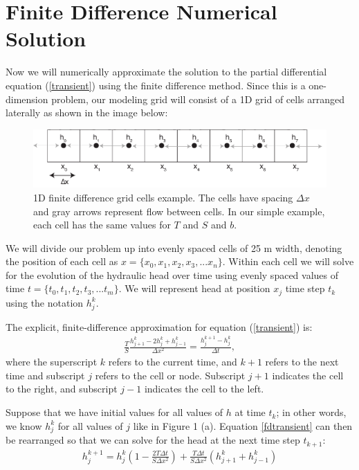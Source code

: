 \documentclass[11pt, oneside]{article}   	%
\begin{document}
\section*{Finite Difference Numerical Solution}
Now we will numerically approximate the solution to the partial differential equation (\ref{transient}) using the finite difference method.  Since this is a one-dimension problem, our modeling grid will consist of a 1D grid of cells arranged laterally as shown in the image below:

\begin{figure}[htbp]
\begin{center}
\includegraphics[width=.75\textwidth]{grid.pdf}
\caption{1D finite difference grid cells example.  The cells have spacing $\Delta x$ and gray arrows represent flow between cells. In our simple example, each cell has the same values for $T$ and $S$ and $b$.  }
\label{grid}
\end{center}
\end{figure}


We will divide our problem up into evenly spaced cells of 25 m width, denoting the position of each cell as $x = \{x_0, x_1, x_2, x_3, ... x_n\}$.   Within each cell we will solve for the evolution of the hydraulic head over time using evenly spaced values of time $t = \{t_0, t_1, t_2, t_3, ... t_m\}$.  We will represent head at position $x_j$ time step $t_k$ using the notation $h_j^k$. 


The explicit, finite-difference approximation for equation (\ref{transient}) is:
\begin{eqnarray}
\frac{T}{S}\frac{h^k_{j+1}-2 h^k_{j} + h^k_{j-1} }{\Delta x^2} = \frac{h_j^{k+1}-h_j^k }{\Delta t},
\label{fdtransient}
\end{eqnarray}
where the superscript $k$ refers to the current time, and $k+1$ refers to the next time and subscript $j$ refers to the cell or node. Subscript $j+1$ indicates the cell to the right, and subscript $j-1$ indicates the cell to the left.  

Suppose that we have initial values for all values of $h$ at time $t_k$; in other words, we know $h_j^k$ for all values of $j$ like in Figure 1 (a). Equation \ref{fdtransient} can then be rearranged so that we can solve for the head at the next time step $t_{k+1}$:
\begin{eqnarray}
h_j^{k+1} = h_j^{k} \left ( 1 - \frac{2T\Delta t}{S\Delta x^2} \right) +  \frac{T\Delta t}{S\Delta x^2} \left( h_{j+1}^{k} + h_{j-1}^{k} \right)
\label{fdtransient_step}
\end{eqnarray}
\end{document}
